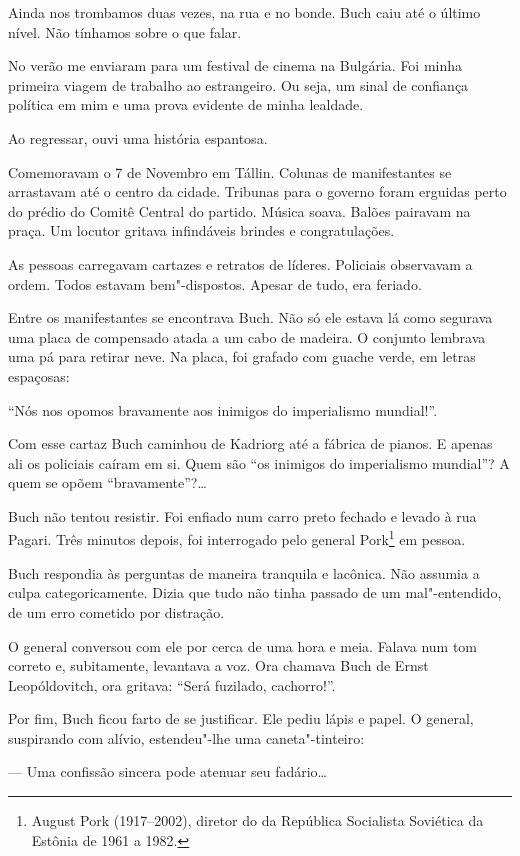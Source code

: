 Ainda nos trombamos duas vezes, na rua e no bonde. Buch caiu até o
último nível. Não tínhamos sobre o que falar.

No verão me enviaram para um festival de cinema na Bulgária. Foi minha
primeira viagem de trabalho ao estrangeiro. Ou seja, um sinal de
confiança política em mim e uma prova evidente de minha lealdade.

Ao regressar, ouvi uma história espantosa.

Comemoravam o 7 de Novembro em Tállin. Colunas de manifestantes se
arrastavam até o centro da cidade. Tribunas para o governo foram
erguidas perto do prédio do Comitê Central do partido. Música soava. Balões
pairavam na praça. Um locutor gritava infindáveis brindes e
congratulações.

As pessoas carregavam cartazes e retratos de líderes. Policiais
observavam a ordem. Todos estavam bem"-dispostos. Apesar de tudo, era
feriado.

Entre os manifestantes se encontrava Buch. Não só ele estava lá como
segurava uma placa de compensado atada a um cabo de madeira. O conjunto
lembrava uma pá para retirar neve. Na placa, foi grafado com guache
verde, em letras espaçosas:

``Nós nos opomos bravamente aos inimigos do imperialismo mundial!''.

Com esse cartaz Buch caminhou de Kadriorg até a fábrica de pianos. E
apenas ali os policiais caíram em si. Quem são ``os inimigos do
imperialismo mundial''? A quem se opõem ``bravamente''?\ldots{}

Buch não tentou resistir. Foi enfiado num carro preto fechado e levado à
rua Pagari. Três minutos depois, foi interrogado pelo general
Pork\footnote{August Pork (1917--2002), diretor do  da República
  Socialista Soviética da Estônia de 1961 a 1982.} em pessoa.

Buch respondia às perguntas de maneira tranquila e lacônica. Não assumia
a culpa categoricamente. Dizia que tudo não tinha passado de um
mal"-entendido, de um erro cometido por distração.

O general conversou com ele por cerca de uma hora e meia. Falava num tom
correto e, subitamente, levantava a voz. Ora chamava Buch de Ernst
Leopóldovitch, ora gritava: ``Será fuzilado, cachorro!''.

Por fim, Buch ficou farto de se justificar. Ele pediu lápis e papel. O
general, suspirando com alívio, estendeu"-lhe uma caneta"-tinteiro:

--- Uma confissão sincera pode atenuar seu fadário\ldots{}

